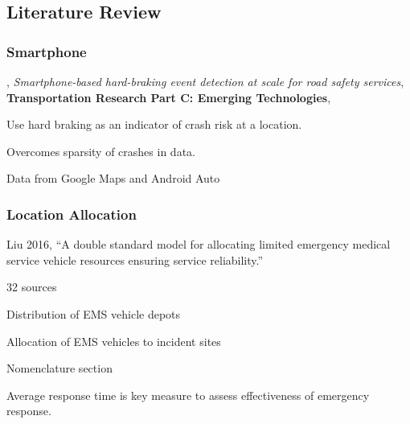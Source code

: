 \subsection{Literature Review}
\label{lit_review}

\begin{comment}

Annals of Emergency Medicine
Annals of Operations Research
Computer Operations Research
Computers and Operational Research
European Journal of Operational Research
IEEE Transactions on Intelligent Transportation Systems
INFORMS Journal on Computation
INFORMS Journal on Computing
International Journal of Operational Research
Journal of Algorithms
Journal of Operations Research, 
Journal of Transportation Engineering
Management Science
Mathematical Programming
Operations Research
Operations Research for Health Care
Transportation Research Record
Transportation Science
TRpA
TRpB
TRpC
TRpE
\end{comment}

\subsubsection{Smartphone}

\citep{LIU2023103949},
{\it Smartphone-based hard-braking event detection at scale for road safety services},
{\bf Transportation Research Part C: Emerging Technologies},

Use hard braking as an indicator of crash risk at a location.

Overcomes sparsity of crashes in data.

Data from Google Maps and Android Auto




\subsubsection{Location Allocation}

\citep{LIU2016120} Liu 2016, ``A double standard model for allocating limited emergency medical service vehicle resources ensuring service reliability.''

32 sources


Distribution of EMS vehicle depots

Allocation of EMS vehicles to incident sites

Nomenclature section

Average response time is key measure to assess effectiveness of emergency response. 


